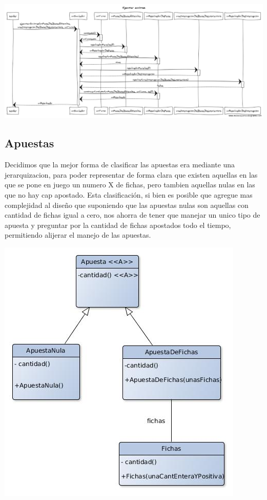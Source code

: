 \begin{center}
\includegraphics[scale=0.4, angle=90]{diseno/Ejecutar_acciones.png}
\end{center}


\subsection{Apuestas}
Decidimos que la mejor forma de clasificar las apuestas era mediante una jerarquizacion, para poder representar de forma clara que existen aquellas en las que se pone en juego un numero X de fichas, pero tambien aquellas nulas en las que no hay cap apostado. Esta clasificación, si bien es posible que agregue mas complejidad al diseño que suponiendo que las apuestas nulas son aquellas con cantidad de fichas igual a cero, nos ahorra de tener que manejar un unico tipo de apuesta y preguntar por la cantidad de fichas apostados todo el tiempo, permitiendo alijerar el manejo de las apuestas.
\begin{center}
\includegraphics[scale=0.4]{diseno/apuestas.jpg}
\end{center}

